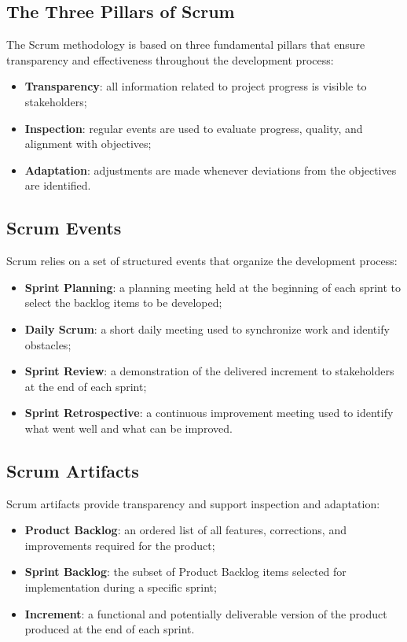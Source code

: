 \subsection{The Three Pillars of Scrum}

The Scrum methodology is based on three fundamental pillars that ensure transparency and
effectiveness throughout the development process:

\begin{itemize}
  \item \textbf{Transparency}: all information related to project progress is visible to
        stakeholders;
  \item \textbf{Inspection}: regular events are used to evaluate progress, quality, and
        alignment with objectives;
  \item \textbf{Adaptation}: adjustments are made whenever deviations from the objectives
        are identified.
\end{itemize}

\subsection{Scrum Events}

Scrum relies on a set of structured events that organize the development process:

\begin{itemize}
  \item \textbf{Sprint Planning}: a planning meeting held at the beginning of each sprint
        to select the backlog items to be developed;
  \item \textbf{Daily Scrum}: a short daily meeting used to synchronize work and identify
        obstacles;
  \item \textbf{Sprint Review}: a demonstration of the delivered increment to stakeholders
        at the end of each sprint;
  \item \textbf{Sprint Retrospective}: a continuous improvement meeting used to identify
        what went well and what can be improved.
\end{itemize}

\subsection{Scrum Artifacts}

Scrum artifacts provide transparency and support inspection and adaptation:

\begin{itemize}
  \item \textbf{Product Backlog}: an ordered list of all features, corrections, and
        improvements required for the product;
  \item \textbf{Sprint Backlog}: the subset of Product Backlog items selected for
        implementation during a specific sprint;
  \item \textbf{Increment}: a functional and potentially deliverable version of the product
        produced at the end of each sprint.
\end{itemize}

